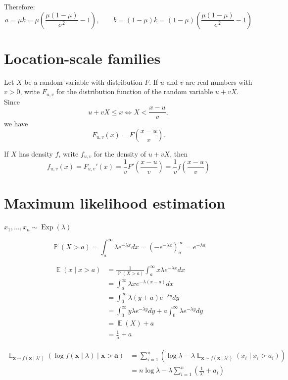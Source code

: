 \documentclass{amsart}
\DeclareMathOperator{\Exp}{\mathbb{E}}
\DeclareMathOperator{\Expon}{Exp}
\DeclareMathOperator{\Prob}{\mathbb{P}}
\newcommand{\vx}{\mathbf{x}}
\newcommand{\va}{\mathbf{a}}
\begin{document}
Therefore:
\[
a = \mu k=\mu\left(\frac{\mu(1 - \mu)}{\sigma^2} - 1\right),\qquad
b = (1 - \mu)k = (1 - \mu)\left(\frac{\mu(1 - \mu)}{\sigma^2} - 1\right)
\]

\section{Location-scale families}

Let $X$ be a random variable with distribution $F$.
If $u$ and $v$ are real numbers with $v > 0$, write $F_{u, v}$
for the distribution function of the random variable $u + vX$.
Since
\[
u + vX \leq x \Longleftrightarrow X < \frac{x - u}{v},
\]
we have
\[
F_{u, v}(x) = F\left(\frac{x - u}{v}\right).
\]

If $X$ has density $f$, write $f_{u, v}$ for the density of $u + vX$,
then 
$$
f_{u, v}(x) = F_{u, v}'(x) = \frac1v F'\left(\frac{x - u}{v}\right)
= \frac1v f\left(\frac{x - u}{v}\right)
$$

\section{Maximum likelihood estimation}

$x_1,\ldots,x_n\sim \Expon(\lambda)$

\[
\Prob(X > a) = \int_a^\infty \lambda e^{-\lambda x}dx = \left(-e^{-\lambda x}\right)^\infty_a = e^{-\lambda a}
\]



\begin{align*}
\Exp(x \mid x > a) &= \frac1{\Prob(X > a)}\int_{a}^\infty x \lambda e^{-\lambda x}dx
\\
&= \int_a^\infty\lambda x e^{-\lambda (x - a)}dx\\
&= \int_0^\infty \lambda (y + a)e^{-\lambda y}dy\\
&= \int_0^\infty y\lambda  e^{-\lambda y}dy + a\int_0^\infty \lambda e^{-\lambda y}dy\\
&= \Exp(X) + a\\
&= \frac1\lambda + a
\end{align*}

\begin{align*}
\Exp_{\vx\sim f(\vx\mid\lambda')}(\log f(\vx\mid \lambda)\mid \vx > \va) &= \sum_{i=1}^n \left(\log \lambda - \lambda \Exp_{\vx\sim f(\vx\mid\lambda')}(x_i\mid x_i > a_i)\right)\\
&= n\log\lambda - \lambda \sum_{i=1}^n \left(\frac1{\lambda'} + a_i\right)
\end{align*}
\end{document}
